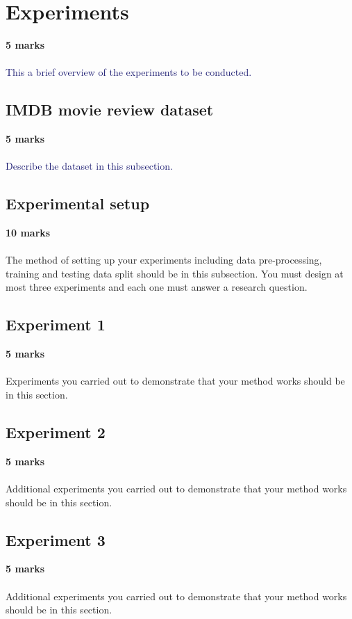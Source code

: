 \documentclass[a4paper,10pt,twocolumn]{article}
\newcommand{\hilight}[2][MidnightBlue]{\textcolor{#1}{#2}}
\begin{document}
\section{Experiments}
\textbf{\hilight[BrickRed]{5 marks}}\\\\
\hilight{This a brief overview of the experiments to be conducted.}
\lipsum[4]

\subsection{IMDB movie review dataset}
\textbf{\hilight[BrickRed]{5 marks}}\\\\
\hilight{Describe the dataset in this subsection.}
\lipsum[2]
\subsection{Experimental setup}
\textbf{\hilight[BrickRed]{10 marks}}\\\\
The method of setting up your experiments including data pre-processing, training and testing data split should be in this subsection.
You must design at most three experiments and each one must answer a research question.
\subsection{Experiment 1} 
\textbf{\hilight[BrickRed]{5 marks}}\\\\
Experiments you carried out to demonstrate that your method works should be in this section. 
\subsection{Experiment 2}
\textbf{\hilight[BrickRed]{5 marks}}\\\\
Additional experiments you carried out to demonstrate that your method works should be in this section.
\subsection{Experiment 3}
\textbf{\hilight[BrickRed]{5 marks}}\\\\
Additional experiments you carried out to demonstrate that your method works should be in this section.
\end{document}
